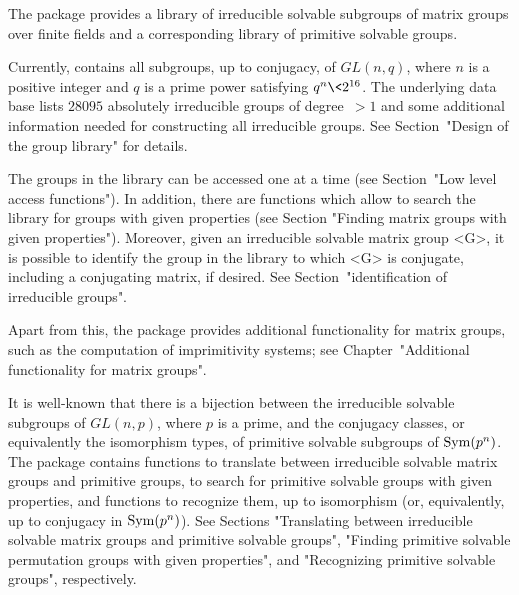 

The package {\IRREDSOL} provides a library of irreducible
solvable subgroups of matrix groups over finite fields and a corresponding library of primitive solvable groups.

Currently, {\IRREDSOL} contains all subgroups, up to conjugacy, of $GL(n, q)$, 
where $n$ is a positive integer and $q$
is a prime power satisfying  $q^n \< 2^{16}$. The underlying data base lists 
$28095$ absolutely irreducible groups of degree~$> 1$ and some additional information
needed for constructing all irreducible groups. See Section~"Design of the group library"
for details.

The groups in the {\IRREDSOL} 
library can be accessed one at a time (see Section~"Low
level access functions"). In addition, there are functions which allow to 
search the library for groups with given properties (see Section "Finding
matrix groups with given properties"). Moreover, given an irreducible solvable matrix group
<G>, it is possible to identify the group in the library to which <G> is conjugate,
including a conjugating matrix, if desired. See Section~"identification of irreducible
groups".

Apart from this, the {\IRREDSOL} package provides additional functionality
for matrix groups, such as the computation of imprimitivity systems;
see Chapter~"Additional functionality for matrix groups".

It is well-known that there is a bijection between the  irreducible solvable subgroups of
$GL(n, p)$, where
$p$ is a prime, and the conjugacy classes, or equivalently the isomorphism types, of
primitive solvable subgroups of ${\rm Sym}(p^n)$. The {\IRREDSOL} package contains
functions to translate between irreducible solvable matrix groups and primitive
groups, to search for primitive solvable groups with given  properties, and functions to
recognize them, up to isomorphism (or, equivalently, up to conjugacy in ${\rm Sym}(p^n)$).  See Sections "Translating between irreducible solvable
matrix groups and primitive solvable groups", "Finding primitive solvable permutation
groups with given properties", and "Recognizing primitive solvable groups", respectively.

